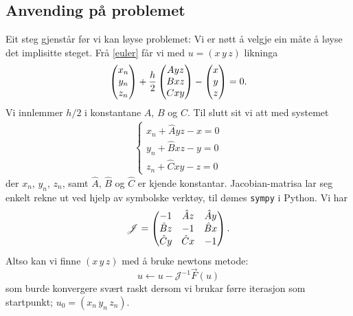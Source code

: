 \documentclass[12pt]{article}
\begin{document}
\begin{multicols*}{2}
    \subsection*{Anvending på problemet}
    Eit steg gjenstår før vi kan løyse problemet:
    Vi er nøtt å velgje ein måte å løyse det implisitte steget.
    Frå \eqref{euler} får vi med
    $u = (x \, y \, z)$ likninga
    \begin{equation}
        \begin{pmatrix}
            x_n \\ y_n \\ z_n
        \end{pmatrix}
        + \frac h 2
        \begin{pmatrix}
            A y z \\ B x z \\ C x y
        \end{pmatrix}
        -
        \begin{pmatrix}
            x \\ y \\ z
        \end{pmatrix}
        = 0 \text.
    \end{equation}
    Vi innlemmer $h/2$ i konstantane $A$, $B$ og $C$.
    Til slutt sit vi att med systemet
    \begin{align*}
        \left\{
        \begin{array}{c}
            x_n + \hat A y z - x = 0 \\
            y_n + \hat B x z - y = 0 \\
            z_n + \hat C x y - z = 0
        \end{array}
        \right.
    \end{align*}
    der $x_n$, $y_n$, $z_n$,
    samt $\hat A$, $\hat B$ og $\hat C$ er kjende konstantar.
    Jacobian-matrisa lar seg enkelt rekne ut ved hjelp av symbolske
    verktøy, til dømes {\tt sympy} i Python. Vi har
    \[
        \mathscr J = \begin{pmatrix}
            -1          &   \hat A z    & \hat A y \\
            \hat B z    &   -1          & \hat B x \\
            \hat C y    &   \hat C x    & -1
        \end{pmatrix} \text.
    \]
    Altso kan vi finne $(x \, y\, z)$ med å bruke newtons metode:
    \[
        u \longleftarrow u - \mathscr J^{-1} \vec F(u)
    \]
    som burde konvergere svært raskt dersom vi brukar
    førre iterasjon som startpunkt; $u_0 = (x_n \, y_n \, z_n)$.





    \printbibliography


\end{multicols*}
\end{document}

